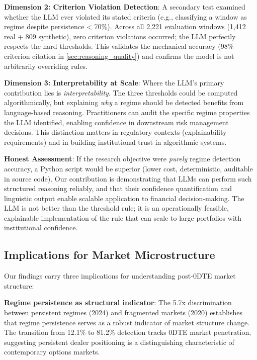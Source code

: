 \textbf{Dimension 2: Criterion Violation Detection}: A secondary test examined whether the LLM ever violated its stated criteria (e.g., classifying a window as regime despite persistence < 70\%). Across all 2,221 evaluation windows (1,412 real + 809 synthetic), zero criterion violations occurred; the LLM perfectly respects the hard thresholds. This validates the mechanical accuracy (98\% criterion citation in \ref{sec:reasoning_quality}) and confirms the model is not arbitrarily overriding rules.

\textbf{Dimension 3: Interpretability at Scale}: Where the LLM's primary contribution lies is \textit{interpretability}. The three thresholds could be computed algorithmically, but explaining \textit{why} a regime should be detected benefits from language-based reasoning. Practitioners can audit the specific regime properties the LLM identified, enabling confidence in downstream risk management decisions. This distinction matters in regulatory contexts (explainability requirements) and in building institutional trust in algorithmic systems.

\textbf{Honest Assessment}: If the research objective were \textit{purely} regime detection accuracy, a Python script would be superior (lower cost, deterministic, auditable in source code). Our contribution is demonstrating that LLMs can perform such structured reasoning reliably, and that their confidence quantification and linguistic output enable scalable application to financial decision-making. The LLM is not better than the threshold rule; it is an operationally feasible, explainable implementation of the rule that can scale to large portfolios with institutional confidence.

\subsection{Implications for Market Microstructure}

Our findings carry three implications for understanding post-0DTE market structure:

\textbf{Regime persistence as structural indicator}: The 5.7x discrimination between persistent regimes (2024) and fragmented markets (2020) establishes that regime persistence serves as a robust indicator of market structure change. The transition from 12.1\% to 81.2\% detection tracks 0DTE market penetration, suggesting persistent dealer positioning is a distinguishing characteristic of contemporary options markets.

